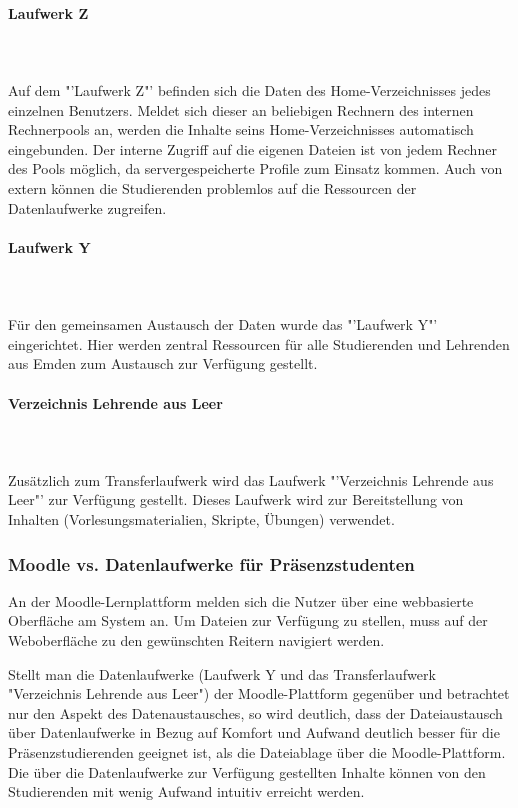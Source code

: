 \paragraph{Laufwerk Z}\mbox{}\\\\
Auf dem "'Laufwerk Z"' befinden sich die Daten des Home-Verzeichnisses jedes einzelnen Benutzers. Meldet sich dieser an beliebigen Rechnern des internen Rechnerpools an, werden die Inhalte seins Home-Verzeichnisses automatisch eingebunden. Der interne Zugriff auf die eigenen Dateien ist von jedem Rechner des Pools möglich, da servergespeicherte Profile zum Einsatz kommen. Auch von extern können die Studierenden problemlos auf die Ressourcen der Datenlaufwerke zugreifen.

\paragraph{Laufwerk Y}\mbox{}\\\\
Für den gemeinsamen Austausch der Daten wurde das "'Laufwerk Y"' eingerichtet. Hier werden zentral Ressourcen für alle Studierenden und Lehrenden aus Emden zum Austausch zur Verfügung gestellt.

\paragraph{Verzeichnis Lehrende aus Leer}\mbox{}\\\\
Zusätzlich zum Transferlaufwerk wird das Laufwerk "'Verzeichnis Lehrende aus Leer"' zur Verfügung gestellt. Dieses Laufwerk wird zur Bereitstellung von Inhalten (Vorlesungsmaterialien, Skripte, Übungen) verwendet.

\subsubsection{Moodle vs. Datenlaufwerke für Präsenzstudenten}
An der Moodle-Lernplattform melden sich die Nutzer über eine webbasierte Oberfläche am System an. Um Dateien zur Verfügung zu stellen, muss auf der Weboberfläche zu den gewünschten Reitern navigiert werden.

Stellt man die Datenlaufwerke (Laufwerk Y und das Transferlaufwerk "Verzeichnis Lehrende aus Leer") der Moodle-Plattform gegenüber und betrachtet nur den Aspekt des Datenaustausches, so wird deutlich, dass der Dateiaustausch über Datenlaufwerke in Bezug auf Komfort und Aufwand deutlich besser für die Präsenzstudierenden geeignet ist, als die Dateiablage über die Moodle-Plattform. Die über die Datenlaufwerke zur Verfügung gestellten Inhalte können von den Studierenden mit wenig Aufwand intuitiv erreicht werden.

